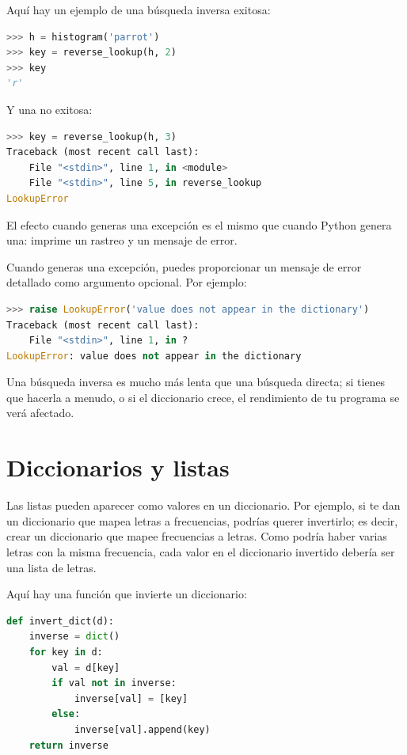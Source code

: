 Aquí hay un ejemplo de una búsqueda inversa exitosa:

\begin{lstlisting}[language=Python]
>>> h = histogram('parrot')
>>> key = reverse_lookup(h, 2)
>>> key
'r'
\end{lstlisting}

Y una no exitosa:

\begin{lstlisting}[language=Python]
>>> key = reverse_lookup(h, 3)
Traceback (most recent call last):
    File "<stdin>", line 1, in <module>
    File "<stdin>", line 5, in reverse_lookup
LookupError
\end{lstlisting}

El efecto cuando generas una excepción es el mismo que cuando Python genera una: imprime un rastreo y un mensaje de error.

Cuando generas una excepción, puedes proporcionar un mensaje de error detallado como argumento opcional. Por ejemplo:

\begin{lstlisting}[language=Python]
>>> raise LookupError('value does not appear in the dictionary')
Traceback (most recent call last):
    File "<stdin>", line 1, in ?
LookupError: value does not appear in the dictionary
\end{lstlisting}

Una búsqueda inversa es mucho más lenta que una búsqueda directa; si tienes que hacerla a menudo, o si el diccionario crece, el rendimiento de tu programa se verá afectado.

\section{Diccionarios y listas}

Las listas pueden aparecer como valores en un diccionario. Por ejemplo, si te dan un diccionario que mapea letras a frecuencias, podrías querer invertirlo; es decir, crear un diccionario que mapee frecuencias a letras. Como podría haber varias letras con la misma frecuencia, cada valor en el diccionario invertido debería ser una lista de letras.

Aquí hay una función que invierte un diccionario:

\begin{lstlisting}[language=Python]
def invert_dict(d):
    inverse = dict()
    for key in d:
        val = d[key]
        if val not in inverse:
            inverse[val] = [key]
        else:
            inverse[val].append(key)
    return inverse
\end{lstlisting}

